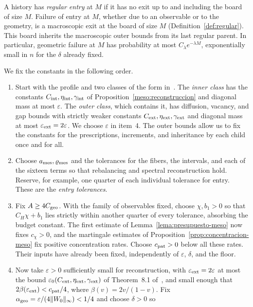 A history has \emph{regular entry} at $M$ if it has no exit up to and including the board of size $M$.
Failure of entry at $M$, whether due to an observable or to the geometry, is a macroscopic exit at the
board of size $M$ (Definition~\ref{def:regular}). This board inherits the macroscopic outer bounds from
its last regular parent. In particular, geometric failure at $M$ has probability at most $C_\lambda
e^{-\lambda M}$, exponentially small in $n$ for the $\delta$ already fixed.

We fix the constants in the following order.
\begin{enumerate}
\item Start with the profile and two classes of the form in~\cite[Section~8.1]{pred}. The \emph{inner
class} has the constants $C_{\rm int},\eta_{\rm int},\gamma_{\rm int}$ of
Proposition~\ref{meso:reconstruccion} and diagonal mass at most $\varepsilon$. The \emph{outer class},
which contains it, has diffusion, vacancy, and gap bounds with strictly weaker constants $C_{\rm
ext},\eta_{\rm ext},\gamma_{\rm ext}$ and diagonal mass at most $\varepsilon_{\rm ext}=2\varepsilon$. We
choose $\varepsilon$ in item~4. The outer bounds allow us to fix the constants for the prescriptions,
increments, and inheritance by each child once and for all.
\item Choose $a_{\rm mes},\varrho_{\rm mes}$ and the tolerances for the fibers, the intervals, and each of
the sixteen terms so that rebalancing and spectral reconstruction hold. Reserve, for example, one quarter
of each individual tolerance for entry. These are the \emph{entry tolerances}.
\item Fix $A\ge4C_{\rm geo}$. With the family of observables fixed, choose $\chi,b_1>0$ so that
$C_H\chi+b_1$ lies strictly within another quarter of every tolerance, absorbing the budget constant.
The first estimate of Lemma~\ref{lema:presupuesto-meso} now fixes $c_\chi>0$, and the martingale
estimates of Proposition~\ref{prop:concentracion-meso} fix positive concentration rates. Choose
$c_{\rm pat}>0$ below all these rates. Their inputs have already been fixed, independently of
$\varepsilon$, $\delta$, and the floor.
\item Now take $\varepsilon>0$ sufficiently small for reconstruction, with $\varepsilon_{\rm
ext}=2\varepsilon$ at most the bound $\varepsilon_0(C_{\rm ext},\eta_{\rm ext},\gamma_{\rm ext})$ of
Theorem~8.1 of~\cite{pred}, and small enough that $2\beta(\varepsilon_{\rm ext})<c_{\rm pat}/4$, where
${\beta(v)=2v/(1-v)}$. Fix $\alpha_{\rm geo}=\varepsilon/(4\|W_0\|_\infty)<1/4$ and choose $\delta>0$ so

\end{enumerate}
